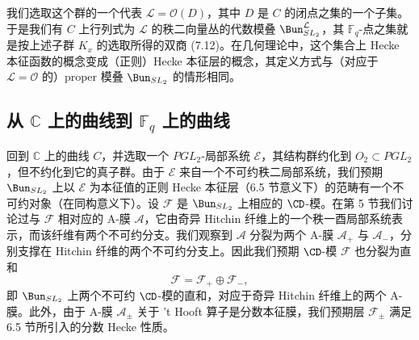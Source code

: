 
我们选取这个群的一个代表 $\mathcal{L} = \mathcal{O}(D)$，其中 $D$ 是 $C$ 的闭点之集的一个子集。于是我们有 $C$ 上行列式为 $\mathcal{L}$ 的秩二向量丛的代数模叠 $\Bun^{\mathcal{L}}_{SL_2}$，其 $\mathbb{F}_q$-点之集就是按上述子群 $K_x$ 的选取所得的双商 (7.12)。在几何理论中，这个集合上 Hecke 本征函数的概念变成（正则）Hecke 本征层的概念，其定义方式与（对应于 $\mathcal{L} = \mathcal{O}$ 的）proper 模叠 $\Bun_{SL_2}$ 的情形相同。

\subsection{从 \texorpdfstring{$\mathbb{C}$}{C} 上的曲线到 \texorpdfstring{$\mathbb{F}_q$}{Fq} 上的曲线}

回到 $\mathbb{C}$ 上的曲线 $C$，并选取一个 $PGL_2$-局部系统 $\mathcal{E}$，其结构群约化到 $O_2\subset PGL_2$，但不约化到它的真子群。由于 $\mathcal{E}$ 来自一个不可约秩二局部系统，我们预期 $\Bun_{SL_2}$ 上以 $\mathcal{E}$ 为本征值的正则 Hecke 本征层（6.5 节意义下）的范畴有一个不可约对象（在同构意义下）。设 $\mathcal{F}$ 是 $\Bun_{SL_2}$ 上相应的 $\CD$-模。在第 5 节我们讨论过与 $\mathcal{F}$ 相对应的 A-膜 $\mathcal{A}$，它由奇异 Hitchin 纤维上的一个秩一酉局部系统表示，而该纤维有两个不可约分支。我们观察到 $\mathcal{A}$ 分裂为两个 A-膜 $\mathcal{A}_+$ 与 $\mathcal{A}_-$，分别支撑在 Hitchin 纤维的两个不可约分支上。因此我们预期 $\CD$-模 $\mathcal{F}$ 也分裂为直和
\begin{equation}\tag{8.5}
\mathcal{F} = \mathcal{F}_+ \oplus \mathcal{F}_-,
\end{equation}
即 $\Bun_{SL_2}$ 上两个不可约 $\CD$-模的直和，对应于奇异 Hitchin 纤维上的两个 A-膜。此外，由于 A-膜 $\mathcal{A}_\pm$ 关于 't Hooft 算子是分数本征膜，我们预期层 $\mathcal{F}_\pm$ 满足 6.5 节所引入的分数 Hecke 性质。

